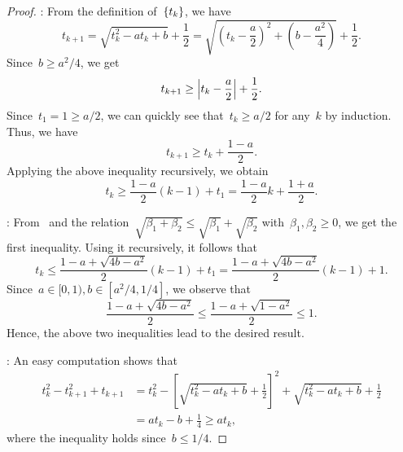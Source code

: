 \documentclass[../main]{subfiles}
\begin{document}
\begin{proof}
    :
    From the definition of~$\set{t_k}$, we have
    \begin{equation} \label{eq:t cs} 
        t_{k + 1} = \sqrt{t_k^2 - a t_k + b} + \frac{1}{2}
        = \sqrt{\left( t_k - \frac{a}{2} \right)^2 + \left( b - \frac{a^2}{4} \right)} + \frac{1}{2}
    .\end{equation}
    Since~$b \ge a^2 / 4$, we get
    \begin{equation}
        t_{k + 1} \ge \abs*{t_k - \frac{a}{2}} + \frac{1}{2}
    .\end{equation}
    Since~$t_1 = 1 \ge a / 2$, we can quickly see that~$t_k \ge a / 2$ for any~$k$ by induction.
    Thus, we have
    \begin{equation}
        t_{k + 1} \ge t_k + \frac{1 - a}{2}
    .\end{equation}
    Applying the above inequality recursively, we obtain
    \begin{equation}
        t_k \ge \frac{1 - a}{2} (k - 1) + t_1 = \frac{1 - a}{2} k + \frac{1 + a}{2}
    .\end{equation}

    :
    From~ and the relation~$\sqrt{\beta_1 + \beta_2} \le \sqrt{\beta_1} + \sqrt{\beta_2}$ with~$\beta_1, \beta_2 \ge 0$, we get the first inequality.
    Using it recursively, it follows that
    \begin{equation}
        t_k \le \frac{1 - a + \sqrt{4 b - a^2}}{2} (k - 1) + t_1 = \frac{1 - a + \sqrt{4 b - a^2}}{2} (k - 1) + 1
    .\end{equation} 
    Since~$a \in [0, 1), b \in [a^2 / 4, 1 / 4]$, we observe that
    \begin{equation}
        \frac{1 - a + \sqrt{4 b - a^2}}{2} \le \frac{1 - a + \sqrt{1 - a^2}}{2} \le 1
    .\end{equation} 
    Hence, the above two inequalities lead to the desired result.

    :
    An easy computation shows that
    \begin{equation}
        \begin{split}
            t_k^2 - t_{k + 1}^2 + t_{k + 1} &= t_k^2 - \left[ \sqrt{t_k^2 - a t_k + b} + \frac{1}{2} \right]^2 + \sqrt{t_k^2 - a t_k + b} + \frac{1}{2} \\
                                            &= a t_k - b + \frac{1}{4} \ge a t_k
    ,\end{split}
    \end{equation} 
    where the inequality holds since~$b \le 1 / 4$.


\end{proof}
\end{document}
